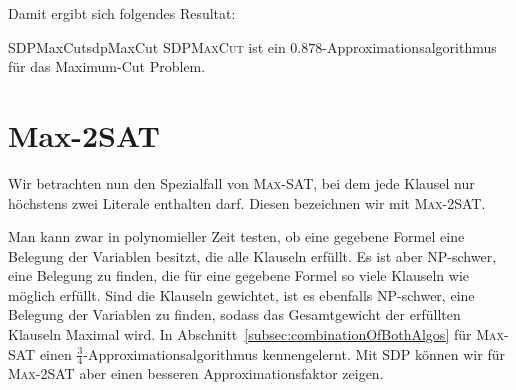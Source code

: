 \documentclass[language=ngerman,algolist]{TemplateLecture}
\begin{document}
Damit ergibt sich folgendes Resultat:

\begin{thm}{SDPMaxCut}{sdpMaxCut}
    \textsc{SDPMaxCut} ist ein $0.878$-Approximationsalgorithmus für das Maximum-Cut Problem.
\end{thm}


\section{Max-2SAT}

Wir betrachten nun den Spezialfall von \textsc{Max-SAT}, bei dem jede Klausel nur höchstens zwei Literale enthalten darf. Diesen bezeichnen wir mit \textsc{Max-2SAT}.

Man kann zwar in polynomieller Zeit testen, ob eine gegebene Formel eine Belegung der Variablen besitzt, die alle Klauseln erfüllt. Es ist aber NP-schwer, eine Belegung zu finden, die für eine gegebene Formel so viele Klauseln wie möglich erfüllt. Sind die Klauseln gewichtet, ist es ebenfalls NP-schwer, eine Belegung der Variablen zu finden, sodass das Gesamtgewicht der erfüllten Klauseln Maximal wird. In Abschnitt~\ref{subsec:combinationOfBothAlgos} für \textsc{Max-SAT} einen $\frac{3}{4}$-Approximationsalgorithmus kennengelernt. Mit SDP können wir für \textsc{Max-2SAT} aber einen besseren Approximationsfaktor zeigen.
\end{document}
